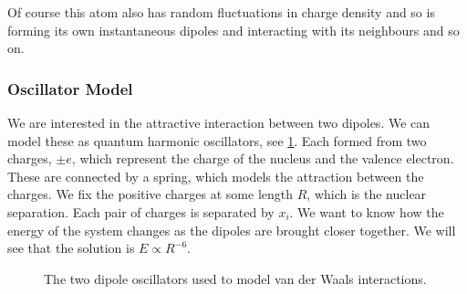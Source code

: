 \documentclass[fleqn]{NotesClass}
\begin{document}
    Of course this atom also has random fluctuations in charge density and so is forming its own instantaneous dipoles and interacting with its neighbours and so on.
    
    \subsubsection{Oscillator Model}
    We are interested in the attractive interaction between two dipoles.
    We can model these as quantum harmonic oscillators, see \cref{fig:dipole oscillators}.
    Each formed from two charges, \(\pm e\), which represent the charge of the nucleus and the valence electron.
    These are connected by a spring, which models the attraction between the charges.
    We fix the positive charges at some length \(R\), which is the nuclear separation.
    Each pair of charges is separated by \(x_i\).
    We want to know how the energy of the system changes as the dipoles are brought closer together.
    We will see that the solution is \(E \propto R^{-6}\).
    
    \begin{figure}
        \caption{The two dipole oscillators used to model van der Waals interactions.}
        \label{fig:dipole oscillators}
    \end{figure}
    
\end{document}
